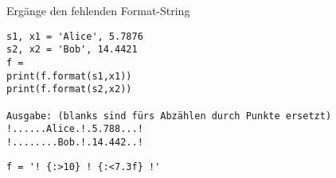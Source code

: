 \question[2] Ergänge den fehlenden Format-String
\begin{lstlisting}
s1, x1 = 'Alice', 5.7876
s2, x2 = 'Bob', 14.4421
f =
print(f.format(s1,x1))
print(f.format(s2,x2))

Ausgabe: (blanks sind fürs Abzählen durch Punkte ersetzt)
!......Alice.!.5.788...!
!........Bob.!.14.442..!
\end{lstlisting}
\begin{solutionbox}{2cm}
\begin{lstlisting}
f = '! {:>10} ! {:<7.3f} !'
\end{lstlisting}
\end{solutionbox}
